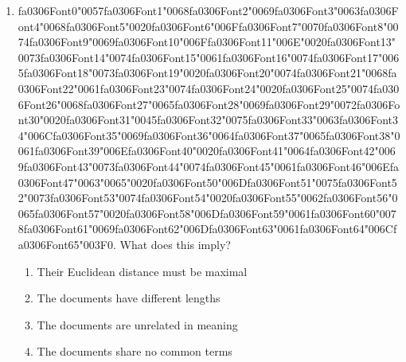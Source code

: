 \documentclass[12pt]{article}
\begin{document}
\begin{enumerate}[label=Q\arabic*.]
 \item {\csname fa0306Font0\endcsname\char"0057}{\csname fa0306Font1\endcsname\char"0068}{\csname fa0306Font2\endcsname\char"0069}{\csname fa0306Font3\endcsname\char"0063}{\csname fa0306Font4\endcsname\char"0068}{\csname fa0306Font5\endcsname\char"0020}{\csname fa0306Font6\endcsname\char"006F}{\csname fa0306Font7\endcsname\char"0070}{\csname fa0306Font8\endcsname\char"0074}{\csname fa0306Font9\endcsname\char"0069}{\csname fa0306Font10\endcsname\char"006F}{\csname fa0306Font11\endcsname\char"006E}{\char"0020}{\csname fa0306Font13\endcsname\char"0073}{\csname fa0306Font14\endcsname\char"0074}{\csname fa0306Font15\endcsname\char"0061}{\csname fa0306Font16\endcsname\char"0074}{\csname fa0306Font17\endcsname\char"0065}{\csname fa0306Font18\endcsname\char"0073}{\csname fa0306Font19\endcsname\char"0020}{\csname fa0306Font20\endcsname\char"0074}{\csname fa0306Font21\endcsname\char"0068}{\csname fa0306Font22\endcsname\char"0061}{\csname fa0306Font23\endcsname\char"0074}{\csname fa0306Font24\endcsname\char"0020}{\csname fa0306Font25\endcsname\char"0074}{\csname fa0306Font26\endcsname\char"0068}{\csname fa0306Font27\endcsname\char"0065}{\csname fa0306Font28\endcsname\char"0069}{\csname fa0306Font29\endcsname\char"0072}{\csname fa0306Font30\endcsname\char"0020}{\csname fa0306Font31\endcsname\char"0045}{\csname fa0306Font32\endcsname\char"0075}{\csname fa0306Font33\endcsname\char"0063}{\csname fa0306Font34\endcsname\char"006C}{\csname fa0306Font35\endcsname\char"0069}{\csname fa0306Font36\endcsname\char"0064}{\csname fa0306Font37\endcsname\char"0065}{\csname fa0306Font38\endcsname\char"0061}{\csname fa0306Font39\endcsname\char"006E}{\csname fa0306Font40\endcsname\char"0020}{\csname fa0306Font41\endcsname\char"0064}{\csname fa0306Font42\endcsname\char"0069}{\csname fa0306Font43\endcsname\char"0073}{\csname fa0306Font44\endcsname\char"0074}{\csname fa0306Font45\endcsname\char"0061}{\csname fa0306Font46\endcsname\char"006E}{\csname fa0306Font47\endcsname\char"0063}{\char"0065}{\char"0020}{\csname fa0306Font50\endcsname\char"006D}{\csname fa0306Font51\endcsname\char"0075}{\csname fa0306Font52\endcsname\char"0073}{\csname fa0306Font53\endcsname\char"0074}{\csname fa0306Font54\endcsname\char"0020}{\csname fa0306Font55\endcsname\char"0062}{\csname fa0306Font56\endcsname\char"0065}{\csname fa0306Font57\endcsname\char"0020}{\csname fa0306Font58\endcsname\char"006D}{\csname fa0306Font59\endcsname\char"0061}{\csname fa0306Font60\endcsname\char"0078}{\csname fa0306Font61\endcsname\char"0069}{\csname fa0306Font62\endcsname\char"006D}{\csname fa0306Font63\endcsname\char"0061}{\csname fa0306Font64\endcsname\char"006C}{\csname fa0306Font65\endcsname\char"003F}$0$. What does this imply?
 \begin{enumerate}[label=(\Alph*)]
     \item Their Euclidean distance must be maximal
     \item The documents have different lengths
     \item The documents are unrelated in meaning
     \item The documents share no common terms
 \end{enumerate}
 

\end{enumerate}
\end{document}
